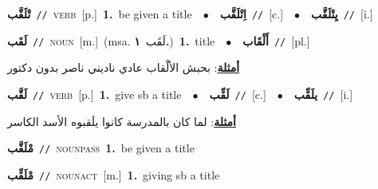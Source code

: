 \documentclass[10pt,a4paper,twoside]{article} %
\begin{document}
\begin{multicols}{2}
{\setlength\topsep{0pt}\textbf{\foreignlanguage{arabic}{تْلَقَّب}}\ {\color{gray}\texttt{//}\color{black}}\ \textsc{verb}\ [p.]\ \textbf{1.}~be given a title\ \ $\bullet$\ \ \setlength\topsep{0pt}\textbf{\foreignlanguage{arabic}{اِتْلَقَّب}}\ {\color{gray}\texttt{//}\color{black}}\ [c.]\ \ $\bullet$\ \ \setlength\topsep{0pt}\textbf{\foreignlanguage{arabic}{يِتْلَقَّب}}\ {\color{gray}\texttt{//}\color{black}}\ [i.]\ } \vspace{2mm}

{\setlength\topsep{0pt}\textbf{\foreignlanguage{arabic}{لَقَب}}\ {\color{gray}\texttt{//}\color{black}}\ \textsc{noun}\ [m.]\ \color{gray}(msa. \foreignlanguage{arabic}{لَقَب}~\foreignlanguage{arabic}{\textbf{١.}})\color{black}\ \textbf{1.}~title\ \ $\bullet$\ \ \setlength\topsep{0pt}\textbf{\foreignlanguage{arabic}{أَلْقَاب}}\ {\color{gray}\texttt{//}\color{black}}\ [pl.]\  \begin{flushright}\color{gray}\foreignlanguage{arabic}{\textbf{\underline{\foreignlanguage{arabic}{أمثلة}}}: بحبش الألْقاب عادي ناديني ناصر بدون دكتور}\end{flushright}\color{black}} \vspace{2mm}

{\setlength\topsep{0pt}\textbf{\foreignlanguage{arabic}{لَقَّب}}\ {\color{gray}\texttt{//}\color{black}}\ \textsc{verb}\ [p.]\ \textbf{1.}~give sb a title\ \ $\bullet$\ \ \setlength\topsep{0pt}\textbf{\foreignlanguage{arabic}{لَقِّب}}\ {\color{gray}\texttt{//}\color{black}}\ [c.]\ \ $\bullet$\ \ \setlength\topsep{0pt}\textbf{\foreignlanguage{arabic}{يلَقِّب}}\ {\color{gray}\texttt{//}\color{black}}\ [i.]\  \begin{flushright}\color{gray}\foreignlanguage{arabic}{\textbf{\underline{\foreignlanguage{arabic}{أمثلة}}}: لما كان بالمدرسة كانوا يلَقبوه الأسد الكاسر}\end{flushright}\color{black}} \vspace{2mm}

{\setlength\topsep{0pt}\textbf{\foreignlanguage{arabic}{مْلَقَّب}}\ {\color{gray}\texttt{//}\color{black}}\ \textsc{noun\textunderscore pass}\ \textbf{1.}~be given a title\ } \vspace{2mm}

{\setlength\topsep{0pt}\textbf{\foreignlanguage{arabic}{مْلَقِّب}}\ {\color{gray}\texttt{//}\color{black}}\ \textsc{noun\textunderscore act}\ [m.]\ \textbf{1.}~giving sb a title\ } \vspace{2mm}


\end{multicols}
\end{document}
